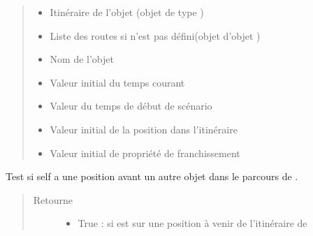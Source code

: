 \documentclass[a4paper,10pt,french]{sphinxmanual}
\begin{document}
\begin{fulllineitems}
\begin{fulllineitems}
\begin{quote}
\begin{description}
\begin{itemize}
\item {} 
 \textendash{} Itinéraire de l’objet  (objet de type )

\item {} 
 \textendash{} Liste des routes si  n’est pas défini(objet  d’objet )

\item {} 
 \textendash{} Nom de l’objet 

\item {} 
 \textendash{} Valeur initial du temps courant

\item {} 
 \textendash{} Valeur du temps de début de scénario

\item {} 
 \textendash{} Valeur initial de la position dans l’itinéraire

\item {} 
 \textendash{} Valeur initial de propriété de franchissement

\end{itemize}

\end{description}\end{quote}

\end{fulllineitems}


\begin{fulllineitems}
\label{\detokenize{road_objects/road_item:road_objects.road_item.RoadItem.__le__}}
Test si self a une position avant un autre objet dans le parcours de .
\begin{quote}\begin{description}
\item[{Retourne}] \leavevmode
\begin{itemize}
\item {} 
True : si  est sur une position à venir de l’itinéraire de 


\end{itemize}
\end{description}
\end{quote}
\end{fulllineitems}
\end{fulllineitems}
\end{document}
